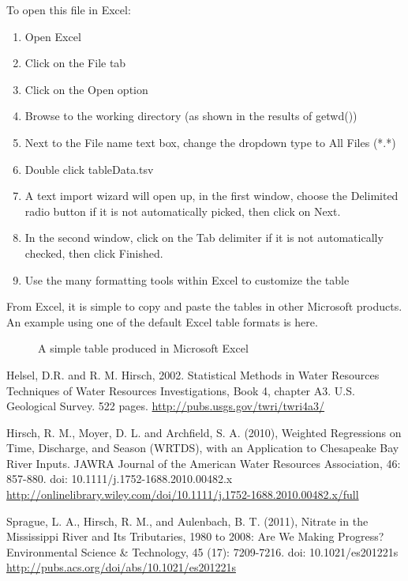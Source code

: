 \documentclass[a4paper,11pt]{article}
\begin{document}
To open this file in Excel:
\begin{enumerate}
\item Open Excel
\item Click on the File tab
\item Click on the Open option
\item Browse to the working directory (as shown in the results of getwd())
\item Next to the File name text box, change the dropdown type to All Files (*.*)
\item Double click tableData.tsv
\item A text import wizard will open up, in the first window, choose the Delimited radio button if it is not automatically picked, then click on Next.
\item In the second window, click on the Tab delimiter if it is not automatically checked, then click Finished.
\item Use the many formatting tools within Excel to customize the table
\end{enumerate}

From Excel, it is simple to copy and paste the tables in other Microsoft products. An example using one of the default Excel table formats is here.

\begin{figure}[ht!]
\centering
\caption{A simple table produced in Microsoft Excel}
\label{overflow}
\end{figure}

\clearpage
\begin{thebibliography}{10}

Helsel, D.R. and R. M. Hirsch, 2002. Statistical Methods in Water Resources Techniques of Water Resources Investigations, Book 4, chapter A3. U.S. Geological Survey. 522 pages. \url{http://pubs.usgs.gov/twri/twri4a3/}

Hirsch, R. M., Moyer, D. L. and Archfield, S. A. (2010), Weighted Regressions on Time, Discharge, and Season (WRTDS), with an Application to Chesapeake Bay River Inputs. JAWRA Journal of the American Water Resources Association, 46: 857-880. doi: 10.1111/j.1752-1688.2010.00482.x \url{http://onlinelibrary.wiley.com/doi/10.1111/j.1752-1688.2010.00482.x/full}

Sprague, L. A., Hirsch, R. M., and Aulenbach, B. T. (2011), Nitrate in the Mississippi River and Its Tributaries, 1980 to 2008: Are We Making Progress? Environmental Science \& Technology, 45 (17): 7209-7216. doi: 10.1021/es201221s \url{http://pubs.acs.org/doi/abs/10.1021/es201221s}

\end{thebibliography}
\end{document}
